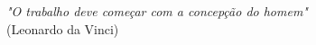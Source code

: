 
\pretextualchapter{}
  \vspace*{\fill}
  \hspace{.45\textwidth}
  \begin{minipage}[b]{.5\textwidth}
    \begin{flushright}
      \textit{"O trabalho deve começar com a concepção do homem"}\\(Leonardo da Vinci)
    \end{flushright}
  \end{minipage}
